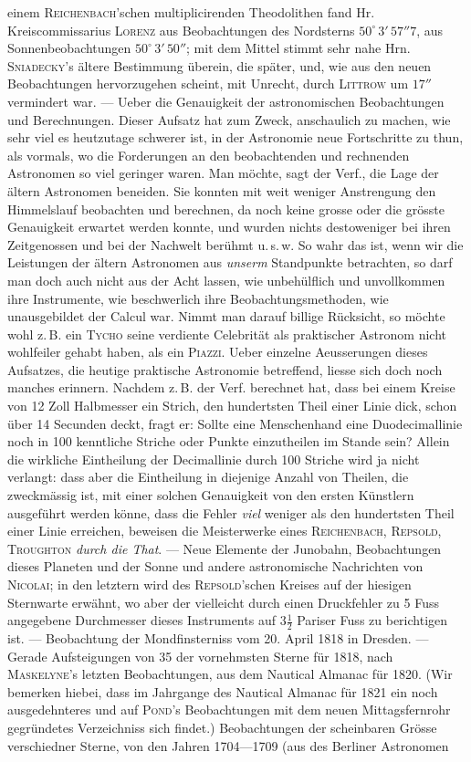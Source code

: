 \noindent einem \textsc{Reichenbach}'schen multiplicirenden Theodolithen fand Hr. Kreiscommissarius \textsc{Lorenz} aus Beobachtungen des Nordsterns $50^\circ\,3'\,57''7$, aus Sonnenbeobachtungen $50^\circ\,3'\,50''$; mit dem Mittel stimmt sehr nahe Hrn. \textsc{Sniadecky}'s ältere Bestimmung überein, die später, und, wie aus den neuen Beobachtungen hervorzugehen scheint, mit Unrecht, durch \textsc{Littrow} um $17''$ vermindert war. --- Ueber die Genauigkeit der astronomischen Beobachtungen und Berechnungen. Dieser Aufsatz hat zum Zweck, anschaulich zu machen, wie sehr viel es heutzutage schwerer ist, in der Astronomie neue Fortschritte zu thun, als vormals, wo die Forderungen an den beobachtenden und rechnenden Astronomen so viel geringer waren. Man möchte, sagt der Verf., die Lage der ältern Astronomen beneiden. Sie konnten mit weit weniger Anstrengung den Himmelslauf beobachten und berechnen, da noch keine grosse oder die grösste Genauigkeit erwartet werden konnte, und wurden nichts destoweniger bei ihren Zeitgenossen und bei der Nachwelt berühmt u.\,s.\,w. So wahr das ist, wenn wir die Leistungen der ältern Astronomen aus \emph{unserm} Standpunkte betrachten, so darf man doch auch nicht aus der Acht lassen, wie unbehülflich und unvollkommen ihre Instrumente, wie beschwerlich ihre Beobachtungsmethoden, wie unausgebildet der Calcul war. Nimmt man darauf billige Rücksicht, so möchte wohl z.\,B. ein \textsc{Tycho} seine verdiente Celebrität als praktischer Astronom nicht wohlfeiler gehabt haben, als ein \textsc{Piazzi}. Ueber einzelne Aeusserungen dieses Aufsatzes, die heutige praktische Astronomie betreffend, liesse sich doch noch manches erinnern. Nachdem z.\,B. der Verf. berechnet hat, dass bei einem Kreise von 12 Zoll Halbmesser ein Strich, den hundertsten Theil einer Linie dick, schon über 14 Secunden deckt, fragt er: Sollte eine Menschenhand eine Duodecimallinie noch in 100 kenntliche Striche oder Punkte einzutheilen im Stande sein? Allein die wirkliche Eintheilung der Decimallinie durch 100 Striche wird ja nicht verlangt: dass aber die Eintheilung in diejenige Anzahl von Theilen, die zweckmässig ist, mit einer solchen Genauigkeit von den ersten Künstlern ausgeführt werden könne, dass die Fehler \emph{viel} weniger als den hundertsten Theil einer Linie erreichen, beweisen die Meisterwerke eines \textsc{Reichenbach}, \textsc{Repsold}, \textsc{Troughton} \emph{durch die That}. --- Neue Elemente der Junobahn, Beobachtungen dieses Planeten und der Sonne und andere astronomische Nachrichten von \textsc{Nicolai}; in den letztern wird des \textsc{Repsold}'schen Kreises auf der hiesigen Sternwarte erwähnt, wo aber der vielleicht durch einen Druckfehler zu 5 Fuss angegebene Durchmesser dieses Instruments auf $3\tfrac{1}{2}$ Pariser Fuss zu berichtigen ist. --- Beobachtung der Mondfinsterniss vom 20. April 1818 in Dresden. --- Gerade Aufsteigungen von 35 der vornehmsten Sterne für 1818, nach \textsc{Maskelyne}'s letzten Beobachtungen, aus dem Nautical Almanac für 1820. (Wir bemerken hiebei, dass im Jahrgange des Nautical Almanac für 1821 ein noch ausgedehnteres und auf \textsc{Pond}'s Beobachtungen mit dem neuen Mittagsfernrohr gegründetes Verzeichniss sich findet.) Beobachtungen der scheinbaren Grösse verschiedner Sterne, von den Jahren 1704---1709 (aus des Berliner Astronomen 